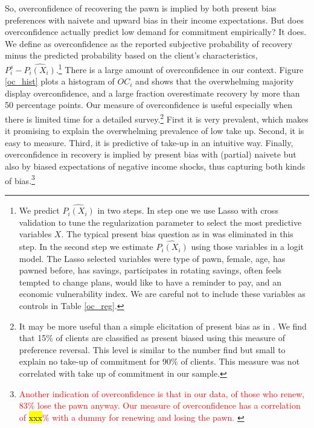 \documentclass[oneside,11pt]{article}
\begin{document}
So, overconfidence of recovering the pawn is implied by both present bias preferences with naivete and upward bias in their income expectations. But does overconfidence actually predict low demand for commitment empirically? It does. We define as overconfidence as the reported subjective probability of recovery minus the predicted probability based on the client's characteristics, $P^s_i-\widehat{P_i(X_i)}$.\footnote{We predict $\widehat{P_i(X_i)}$ in two steps. In step one we use Lasso with cross validation to tune the regularization parameter to select the most predictive variables $X$. The typical present bias question as in \cite{Ashraf} was eliminated in this step. In the second step we estimate $\widehat{P_i(X_i)}$ using those variables in a logit model. The Lasso selected variables were type of pawn, female, age, has pawned before, has savings, participates in rotating savings, often feels tempted to change plans, would like to have a reminder to pay, and an economic vulnerability index. We are careful not to include these variables as controls in Table  \ref{oc_reg}.} There is a large amount of overconfidence in our context. Figure \ref{oc_hist} plots a histogram of $OC_i$ and shows that the overwhelming majority display overconfidence, and a large fraction overestimate recovery by more than 50 percentage points. Our measure of overconfidence is useful especially when there is limited time for a detailed survey.\footnote{It may be more useful than a simple elicitation of present bias as in \cite{Ashraf}. We find that 15\% of clients are classified as present biased using this measure of preference reversal. This level is similar to the number \cite{Ashraf} find but small to explain no take-up of commitment for 90\% of clients. This measure was not correlated with take up of commitment in our sample.} First it is very prevalent, which makes it promising to explain the overwhelming prevalence of low take up. Second, it is easy to measure. Third, it is predictive of take-up in an intuitive way. Finally, overconfidence in recovery is implied by present bias with (partial) naivete but also by biased expectations of negative income shocks, thus capturing both kinds of bias.\footnote{\textcolor{red}{Another indication of overconfidence is that in our data, of those who renew, 83\% lose the pawn anyway. Our measure of overconfidence has a correlation of \hl{xxx}\% with a dummy for renewing and losing the pawn. }} 
\end{document}
